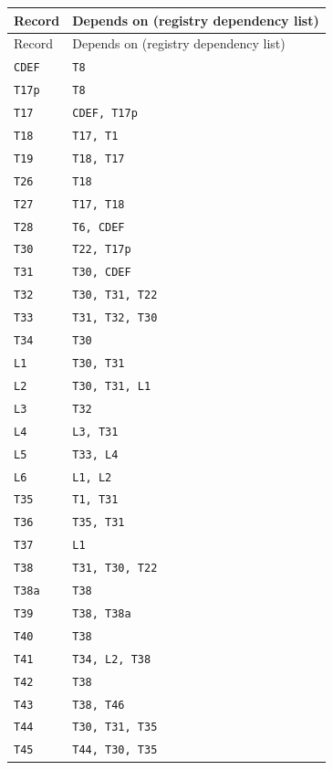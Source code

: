 \footnotesize
\begin{longtable}{@{}p{14mm}p{108mm}@{}}
\toprule Record & Depends on (registry dependency list)\\\midrule\endfirsthead
\toprule Record & Depends on (registry dependency list)\\\midrule\endhead
\texttt{CDEF} & \texttt{T8} \\
\texttt{T17p} & \texttt{T8} \\
\texttt{T17} & \texttt{CDEF, T17p} \\
\texttt{T18} & \texttt{T17, T1} \\
\texttt{T19} & \texttt{T18, T17} \\
\texttt{T26} & \texttt{T18} \\
\texttt{T27} & \texttt{T17, T18} \\
\texttt{T28} & \texttt{T6, CDEF} \\
\texttt{T30} & \texttt{T22, T17p} \\
\texttt{T31} & \texttt{T30, CDEF} \\
\texttt{T32} & \texttt{T30, T31, T22} \\
\texttt{T33} & \texttt{T31, T32, T30} \\
\texttt{T34} & \texttt{T30} \\
\texttt{L1} & \texttt{T30, T31} \\
\texttt{L2} & \texttt{T30, T31, L1} \\
\texttt{L3} & \texttt{T32} \\
\texttt{L4} & \texttt{L3, T31} \\
\texttt{L5} & \texttt{T33, L4} \\
\texttt{L6} & \texttt{L1, L2} \\
\texttt{T35} & \texttt{T1, T31} \\
\texttt{T36} & \texttt{T35, T31} \\
\texttt{T37} & \texttt{L1} \\
\texttt{T38} & \texttt{T31, T30, T22} \\
\texttt{T38a} & \texttt{T38} \\
\texttt{T39} & \texttt{T38, T38a} \\
\texttt{T40} & \texttt{T38} \\
\texttt{T41} & \texttt{T34, L2, T38} \\
\texttt{T42} & \texttt{T38} \\
\texttt{T43} & \texttt{T38, T46} \\
\texttt{T44} & \texttt{T30, T31, T35} \\
\texttt{T45} & \texttt{T44, T30, T35} \\

\end{longtable}
